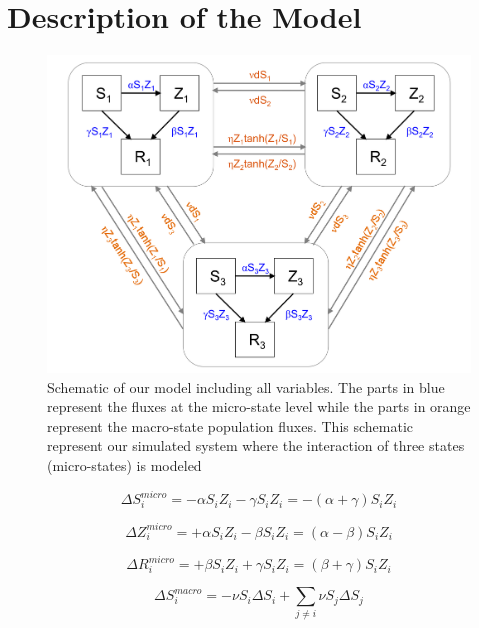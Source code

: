 \documentclass[11pt]{article}
\begin{document}
\section{Description of the Model}\indent

\begin{figure}[h!]
\centering
\includegraphics[scale=0.15]{Zombie_model.png}
\caption{Schematic of our model including all variables. The parts in blue represent the fluxes at the micro-state level while the parts in orange represent the macro-state population fluxes. This schematic represent our simulated system where the interaction of three states (micro-states) is modeled }
\end{figure}

\begin{equation}
\Delta S_{i}^{micro} = -\alpha S_{i} Z_{i} -\gamma S_{i} Z_{i} = -(\alpha + \gamma) S_{i} Z_{i}
\end{equation}

\begin{equation}
\Delta Z_{i}^{micro} = +\alpha S_{i} Z_{i} - \beta S_{i} Z_{i} = (\alpha - \beta) S_{i} Z_{i}
\end{equation}

\begin{equation}
\Delta R_{i}^{micro} = +\beta S_{i} Z_{i} + \gamma S_{i} Z_{i} = (\beta + \gamma) S_{i} Z_{i}
\end{equation}

\begin{equation}
\Delta S_{i}^{macro} = -\nu S_{i} \Delta S_{i} + \sum_{j\neq i}{\nu S_{j} \Delta S_{j}}
\end{equation}
\end{document}
